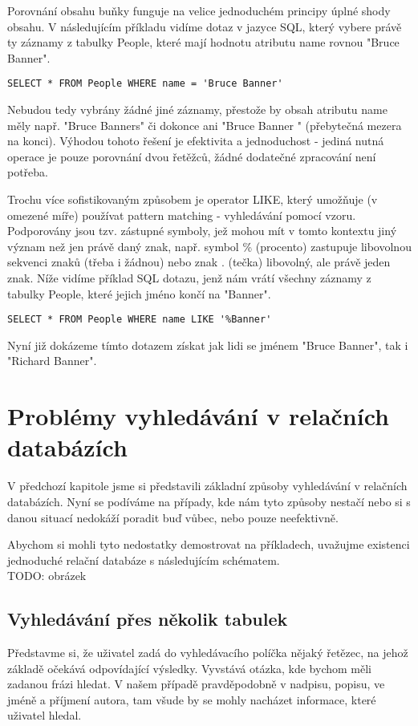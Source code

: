 \documentclass[11pt,draft,oneside]{fithesis2}
\begin{document}
Porovnání obsahu buňky funguje na velice jednoduchém principy úplné shody obsahu. V následujícím příkladu vidíme dotaz v jazyce SQL, který vybere právě ty záznamy z tabulky People, které mají hodnotu atributu name rovnou "Bruce Banner". 
\begin{verbatim}
SELECT * FROM People WHERE name = 'Bruce Banner'
\end{verbatim}

Nebudou tedy vybrány žádné jiné záznamy, přestože by obsah atributu name měly např. "Bruce Banners" či dokonce ani "Bruce Banner " (přebytečná mezera na konci). Výhodou tohoto řešení je efektivita a jednoduchost - jediná nutná operace je 
pouze porovnání dvou řetěžců, žádné dodatečné zpracování není potřeba. 

Trochu více sofistikovaným způsobem je operator LIKE, který umožňuje (v omezené míře) používat pattern matching - vyhledávání pomocí vzoru. Podporovány jsou tzv. zástupné symboly, jež mohou mít v tomto kontextu jiný význam než jen právě daný znak, např. symbol \% 
(procento) zastupuje libovolnou sekvenci znaků (třeba i žádnou) nebo znak . (tečka) libovolný, ale právě jeden znak. Níže vidíme příklad SQL dotazu, jenž nám vrátí všechny záznamy z tabulky People, které jejich jméno končí na "Banner".
\begin{verbatim}
SELECT * FROM People WHERE name LIKE '%Banner'
\end{verbatim}

Nyní již dokázeme tímto dotazem získat jak lidi se jménem "Bruce Banner", tak i "Richard Banner". 

\section{Problémy vyhledávání v relačních databázích}
V předchozí kapitole jsme si představili základní způsoby vyhledávání v relačních databázích. Nyní se podíváme na případy, kde nám tyto způsoby nestačí nebo si s danou situací nedokáží poradit buď vůbec, nebo pouze neefektivně.

Abychom si mohli tyto nedostatky demostrovat na příkladech, uvažujme existenci jednoduché relační databáze s následujícím schématem.
\\ TODO: obrázek

\subsection{Vyhledávání přes několik tabulek}
Představme si, že uživatel zadá do vyhledávacího políčka nějaký řetězec, na jehož základě očekává odpovídající výsledky. Vyvstává otázka, kde bychom měli zadanou frázi hledat. V našem případě
pravděpodobně v nadpisu, popisu, ve jméně a příjmení autora, tam všude by se mohly nacházet informace, které uživatel hledal. 
\end{document}
